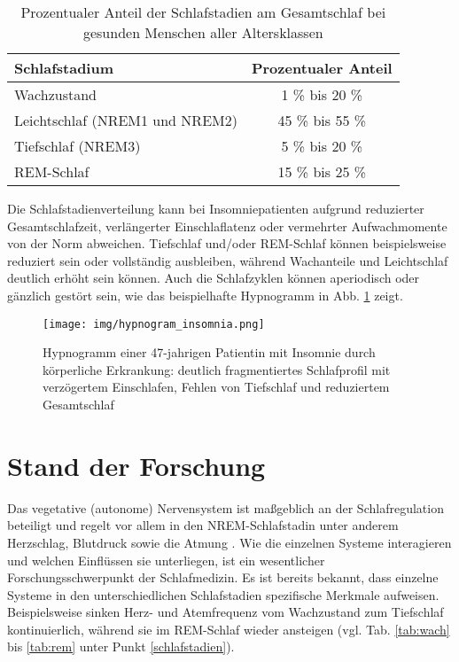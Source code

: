 \begin{table}[H] 
\centering
\begin{small}
\begin{tabular}{lc}
\toprule
\multicolumn{1}{l}{\textbf{Schlafstadium}} & \multicolumn{1}{c}{\textbf{Prozentualer Anteil}}\\  
\midrule
Wachzustand & 1 \% bis 20 \%\\
Leichtschlaf (\acs{NREM}1 und \acs{NREM}2) & 45 \% bis 55 \%\\
Tiefschlaf (\acs{NREM}3) & 5 \% bis 20 \%\\
\acs{REM}-Schlaf & 15 \% bis 25 \%\\
\bottomrule
\end{tabular}
\caption[Prozentuale Schlafstadienverteilung]{Prozentualer Anteil der Schlafstadien am Gesamtschlaf bei gesunden Menschen aller Altersklassen \parencite{lee-chiong_sleep_2008, steinberg_schlafmedizin_2010, danker-hopfe_percentile_2005}}
\label{tab:anteile_schlafstadien}
\end{small}
\end{table}


Die Schlafstadienverteilung kann bei Insomniepatienten aufgrund reduzierter Gesamtschlafzeit, verlängerter Einschlaflatenz oder vermehrter Aufwachmomente von der Norm abweichen. Tiefschlaf und/oder \acs{REM}-Schlaf können beispielsweise reduziert sein oder vollständig ausbleiben, während Wachanteile und Leichtschlaf deutlich erhöht sein können. Auch die Schlafzyklen können aperiodisch oder gänzlich gestört sein, wie das beispielhafte Hypnogramm in Abb. \ref{fig:hypnogram_insomnia} zeigt. \parencite{happe_schlafmedizin_2009}

\begin{figure}[H]
	\centering
	\texttt{[image: img/hypnogram\_insomnia.png]}
	\caption[Hypnogramm von gestörtem Schlaf]{Hypnogramm einer 47-jahrigen Patientin mit Insomnie durch körperliche Erkrankung: deutlich fragmentiertes Schlafprofil mit verzögertem Einschlafen, Fehlen von Tiefschlaf und reduziertem Gesamtschlaf  \parencite{happe_schlafmedizin_2009}}
	\label{fig:hypnogram_insomnia}
\end{figure}

\section{Stand der Forschung}\label{stand} 

Das vegetative (autonome) Nervensystem ist maßgeblich an der Schlafregulation beteiligt und regelt vor allem in den \acs{NREM}-Schlafstadin unter anderem Herzschlag, Blutdruck sowie die Atmung \parencite{steinberg_schlafmedizin_2010}. Wie die einzelnen Systeme interagieren und welchen Einflüssen sie unterliegen, ist ein wesentlicher Forschungsschwerpunkt der Schlafmedizin. Es ist bereits bekannt, dass einzelne Systeme in den unterschiedlichen Schlafstadien spezifische Merkmale aufweisen. Beispielsweise sinken Herz- und Atemfrequenz vom Wachzustand zum Tiefschlaf kontinuierlich, während sie im REM-Schlaf wieder ansteigen (vgl. Tab. \ref{tab:wach} bis \ref{tab:rem} unter Punkt \ref{schlafstadien}). \parencite{lee-chiong_sleep_2008, rasche_update_2003, penzel_schlafstorungen_2005}\\

